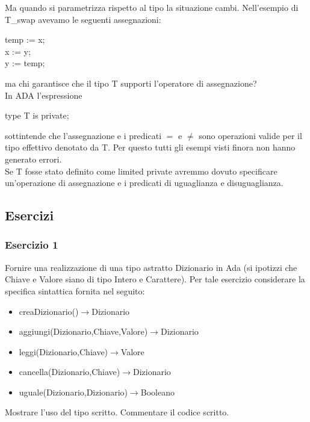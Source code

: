 \documentclass{article}
\begin{document}
	Ma quando si parametrizza rispetto al tipo la situazione cambi. Nell'esempio di T\_swap avevamo le seguenti assegnazioni:
	\begin{center}
		temp := x; \\
		x := y; \\
		y := temp;
	\end{center}
	ma chi garantisce che il tipo T supporti l'operatore di assegnazione? \\
	In ADA l'espressione
	\begin{center}
		type T is private;
	\end{center}
	sottintende che l'assegnazione e i predicati $=$ e $\neq$ sono operazioni valide per il tipo effettivo denotato da T. Per questo tutti gli esempi visti finora non hanno generato errori. \\
	Se T fosse stato definito come limited private avremmo dovuto specificare un'operazione di assegnazione e i predicati di uguaglianza e disuguaglianza.

	\subsection{Esercizi}
	\subsubsection*{Esercizio 1}
	Fornire una realizzazione di una tipo astratto Dizionario in Ada (si ipotizzi che Chiave e Valore siano di tipo Intero e Carattere). Per tale esercizio considerare la specifica sintattica fornita nel seguito:
	\begin{itemize}
		\item creaDizionario()$\rightarrow$Dizionario
		\item aggiungi(Dizionario,Chiave,Valore)$\rightarrow$Dizionario
		\item leggi(Dizionario,Chiave)$\rightarrow$Valore
		\item cancella(Dizionario,Chiave)$\rightarrow$Dizionario
		\item uguale(Dizionario,Dizionario)$\rightarrow$Booleano
	\end{itemize}
	Mostrare l'uso del tipo scritto. Commentare il codice scritto.
\end{document}

